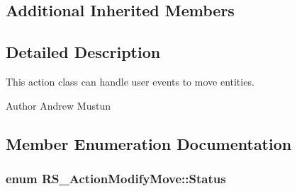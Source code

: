 \subsection*{Additional Inherited Members}


\subsection{Detailed Description}
This action class can handle user events to move entities.

\begin{DoxyAuthor}{Author}
Andrew Mustun 
\end{DoxyAuthor}


\subsection{Member Enumeration Documentation}
\hypertarget{classRS__ActionModifyMove_a5e4281cd716ccea2929cd7122da8062a}{
\subsubsection[{Status}]{\setlength{\rightskip}{0pt plus 5cm}enum {\bf R\-S\-\_\-\-Action\-Modify\-Move\-::\-Status}}}\label{classRS__ActionModifyMove_a5e4281cd716ccea2929cd7122da8062a}
